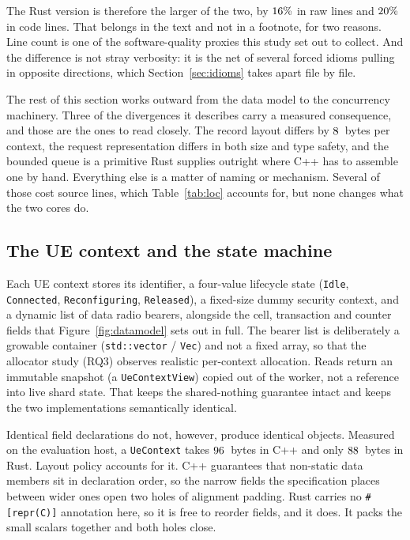 \documentclass[english,oneside,a4paper,censored,csm,software-track-2020]{HYthesisML}
\begin{document}
The Rust version is therefore the larger of the two, by $16\%$ in raw lines and
$20\%$ in code lines. That belongs in the text and not in a footnote, for two reasons.
Line count is one of the software-quality proxies this study set out to collect. And the
difference is not stray verbosity: it is the net of several forced idioms pulling in opposite
directions, which Section~\ref{sec:idioms} takes apart file by file.

The rest of this section works outward from the data model to the concurrency machinery. Three
of the divergences it describes carry a measured consequence, and those are the ones to read
closely. The record layout differs by $8$~bytes per context, the request
representation differs in both size and type safety, and the bounded queue is a primitive Rust
supplies outright where C++ has to assemble one by hand. Everything else is a matter of naming
or mechanism. Several of those cost source lines, which Table~\ref{tab:loc} accounts for, but
none changes what the two cores do.

\subsection{The UE context and the state machine}\label{sec:uecontext}
Each UE context stores its identifier, a four-value lifecycle state (\texttt{Idle},
\texttt{Connected}, \texttt{Reconfiguring}, \texttt{Released}), a fixed-size dummy security
context, and a dynamic list of data radio bearers, alongside the cell, transaction and counter
fields that Figure~\ref{fig:datamodel} sets out in full. The bearer list is deliberately a
growable container (\texttt{std::vector} / \texttt{Vec}) and not a fixed array, so that the
allocator study (RQ3) observes realistic per-context allocation. Reads return an immutable
snapshot (a \texttt{UeContextView}) copied out of the worker, not a reference into live shard
state. That keeps the shared-nothing guarantee intact and keeps the two implementations
semantically identical.

Identical field declarations do not, however, produce identical objects. Measured on the
evaluation host, a \texttt{UeContext} takes $96$~bytes in C++ and only
$88$~bytes in Rust.
Layout policy accounts for it. C++ guarantees that non-static data members sit in declaration
order, so the narrow fields the specification places between wider ones open two holes of
alignment padding. Rust carries no \texttt{\#[repr(C)]} annotation here, so it is free to
reorder fields, and it does. It packs the small scalars together and both holes close.
\end{document}
